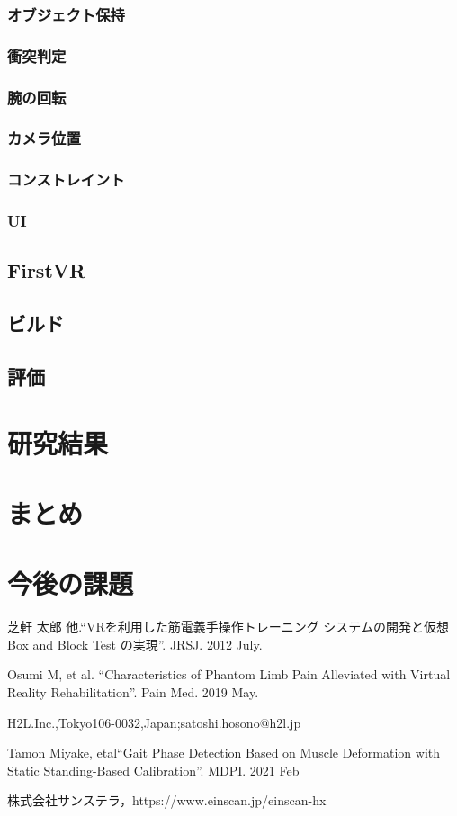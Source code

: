 \documentclass{ltjsreport}
\begin{document}
		\subsection{オブジェクト保持}
		\subsection{衝突判定}
		\subsection{腕の回転}
		\subsection{カメラ位置}
		\subsection{コンストレイント}
		\subsection{UI}
		

	\section{FirstVR}
	\section{ビルド}
	\section{評価}
\chapter{研究結果}
\chapter{まとめ}

\chapter{今後の課題}

\begin{thebibliography}{99}

	芝軒 太郎 他.``VRを利用した筋電義手操作トレーニング
	システムの開発と仮想 Box and Block Test の実現''.
	JRSJ. 2012 July.

	Osumi M, et al.
	``Characteristics of Phantom Limb Pain Alleviated
	with Virtual Reality Rehabilitation''.
	Pain Med. 2019 May.

	H2L.Inc.,Tokyo106-0032,Japan;satoshi.hosono@h2l.jp

	Tamon Miyake, etal``Gait Phase Detection Based on Muscle Deformation
	with Static Standing-Based Calibration''.
	MDPI. 2021 Feb

	株式会社サンステラ，https://www.einscan.jp/einscan-hx

\end{thebibliography}
\end{document}
